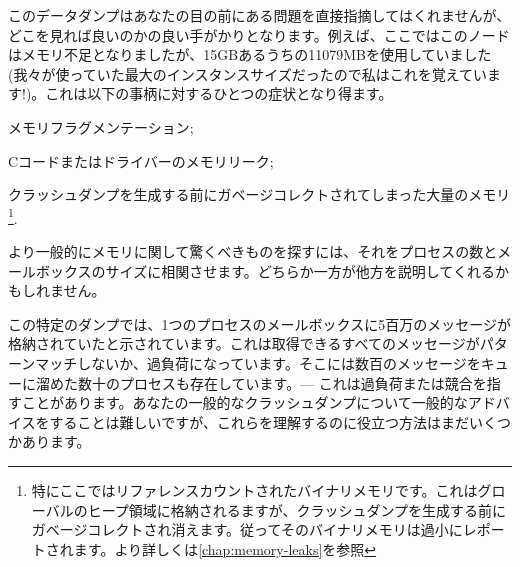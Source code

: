 このデータダンプはあなたの目の前にある問題を直接指摘してはくれませんが、どこを見れば良いのかの良い手がかりとなります。例えば、ここではこのノードはメモリ不足となりましたが、15GBあるうちの11079MBを使用していました(我々が使っていた最大のインスタンスサイズだったので私はこれを覚えています!)。これは以下の事柄に対するひとつの症状となり得ます。

\begin{itemize*}
	\item メモリフラグメンテーション;
	\item Cコードまたはドライバーのメモリリーク;
	\item クラッシュダンプを生成する前にガベージコレクトされてしまった大量のメモリ\footnote{特にここではリファレンスカウントされたバイナリメモリです。これはグローバルのヒープ領域に格納されるますが、クラッシュダンプを生成する前にガベージコレクトされ消えます。従ってそのバイナリメモリは過小にレポートされます。より詳しくは\ref{chap:memory-leaks}を参照}.
\end{itemize*}

より一般的にメモリに関して驚くべきものを探すには、それをプロセスの数とメールボックスのサイズに相関させます。どちらか一方が他方を説明してくれるかもしれません。

この特定のダンプでは、1つのプロセスのメールボックスに5百万のメッセージが格納されていたと示されています。これは取得できるすべてのメッセージがパターンマッチしないか、過負荷になっています。そこには数百のメッセージをキューに溜めた数十のプロセスも存在しています。--- これは過負荷または競合を指すことがあります。あなたの一般的なクラッシュダンプについて一般的なアドバイスをすることは難しいですが、これらを理解するのに役立つ方法はまだいくつかあります。

